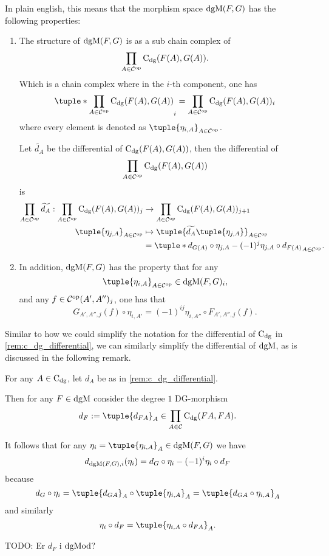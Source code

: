 In plain english, this means that the morphism space \( \operatorname{dgM}(F, G) \) has the following properties:
\begin{enumerate}
    \item {
        The structure of \( \operatorname{dgM}(F, G) \) is as a sub chain complex of
        \[
            \prod_{A \in {\mathcal{C}}^{\operatorname{op}}} \operatorname{C}_{\operatorname{dg}}(F(A), G(A)).
        \]
        Which is a chain complex where in the \( i \)-th component, one has
        \[
            \tuple*{ \prod_{A \in \Cc^{\op}} \C_{\dg}(F(A), G(A)) }_i = \prod_{A \in \Cc^{\op}} \C_{\dg}(F(A), G(A))_i
        \]
        where every element is denoted as \( \tuple{ \eta_{i, A} }_{A \in \Cc^{\op}} \).

        Let \( \widetilde{d_A} \) be the differential of \( \operatorname{C}_{\operatorname{dg}}(F(A), G(A)) \), then the differential of
        \[
            \prod_{A \in {\mathcal{C}}^{\operatorname{op}}} \operatorname{C}_{\operatorname{dg}}(F(A), G(A))
        \]
        is
        \begin{align*}
            \prod_{A \in \Cc^{\op}} \widetilde{d_A} : \prod_{A \in \Cc^{\op}} \C_{\dg}(F(A), G(A))_j &\to \prod_{A \in \Cc^{\op}} \C_{\dg}(F(A), G(A))_{j + 1} \\
            \tuple{ \eta_{j, A} }_{A \in \Cc^{\op}} &\mapsto \tuple{ \widetilde{d_A}\tuple{ \eta_{j, A} } }_{A \in \Cc^{\op}} \\
            &= \tuple*{ d_{G(A)} \circ \eta_{j, A} - (-1)^j \eta_{j, A} \circ d_{F(A)} }_{A \in \Cc^{\op}}.
        \end{align*}
    }
    \item {
        In addition, \( \operatorname{dgM}(F, G) \) has the property that for any
        \[
            \tuple{ \eta_{i, A} }_{A \in \Cc^{\op}} \in \dgM(F, G)_i,
        \]
        and any \( f \in {\mathcal{C}}^{\operatorname{op}}(A', A'')_j \), one has that
        \[
            G_{A', A'', j}(f) \circ \eta_{i, A'} = (-1)^{ij} \eta_{i, A''} \circ F_{A', A'', j}(f).
        \]
    }
\end{enumerate}

Similar to how we could simplify the notation for the differential of \( \operatorname{C}_{\operatorname{dg}} \) in \autoref{rem:c_dg_differential}, we can similarly simplify the differential of \( \operatorname{dgM} \), as is discussed in the following remark.

\begin{remark}
    For any \( A \in \operatorname{C}_{\operatorname{dg}} \), let \( d_A \) be as in \autoref{rem:c_dg_differential}.

    Then for any \( F \in \operatorname{dgM} \) consider the degree \( 1 \) DG-morphism
    \[
        d_F := \tuple{d_{FA}}_A \in \prod_{A \in \Cc} \C_{\dg}(FA, FA).
    \]

    It follows that for any \( \eta_i = \tuple{\eta_{i, A}}_A \in \dgM(F, G) \) we have
    \[
        d_{\operatorname{dgM}(F, G), i}(\eta_i) = d_G \circ \eta_i - (-1)^i \eta_i \circ d_F
    \]
    because
    \[
        d_G \circ \eta_i = \tuple{d_{G A}}_A \circ \tuple{\eta_{i, A}}_A = \tuple{d_{G A} \circ \eta_{i, A}}_A
    \]
    and similarly
    \[
        \eta_i \circ d_F = \tuple{\eta_{i, A} \circ d_{F A}}_A.
    \]

    TODO: Er \( d_F \) i \( \operatorname{dgMod} \)?
\end{remark}

